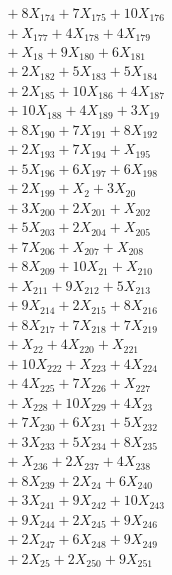 \documentclass[a4paper,10pt]{article}
\begin{document}
{\begin{align}
&\quad  + 8X_{174} + 7X_{175} + 10X_{176} \\[0.5ex]
&\quad  + X_{177} + 4X_{178} + 4X_{179} \\[0.5ex]
&\quad  + X_{18} + 9X_{180} + 6X_{181} \\[0.5ex]
&\quad  + 2X_{182} + 5X_{183} + 5X_{184} \\[0.5ex]
&\quad  + 2X_{185} + 10X_{186} + 4X_{187} \\[0.5ex]
&\quad  + 10X_{188} + 4X_{189} + 3X_{19} \\[0.5ex]
&\quad  + 8X_{190} + 7X_{191} + 8X_{192} \\[0.5ex]
&\quad  + 2X_{193} + 7X_{194} + X_{195} \\[0.5ex]
&\quad  + 5X_{196} + 6X_{197} + 6X_{198} \\[0.5ex]
&\quad  + 2X_{199} + X_{2} + 3X_{20} \\[0.5ex]
&\quad  + 3X_{200} + 2X_{201} + X_{202} \\[0.5ex]
&\quad  + 5X_{203} + 2X_{204} + X_{205} \\[0.5ex]
&\quad  + 7X_{206} + X_{207} + X_{208} \\[0.5ex]
&\quad  + 8X_{209} + 10X_{21} + X_{210} \\[0.5ex]
&\quad  + X_{211} + 9X_{212} + 5X_{213} \\[0.5ex]
&\quad  + 9X_{214} + 2X_{215} + 8X_{216} \\[0.5ex]
&\quad  + 8X_{217} + 7X_{218} + 7X_{219} \\[0.5ex]
&\quad  + X_{22} + 4X_{220} + X_{221} \\[0.5ex]
&\quad  + 10X_{222} + X_{223} + 4X_{224} \\[0.5ex]
&\quad  + 4X_{225} + 7X_{226} + X_{227} \\[0.5ex]
&\quad  + X_{228} + 10X_{229} + 4X_{23} \\[0.5ex]
&\quad  + 7X_{230} + 6X_{231} + 5X_{232} \\[0.5ex]
&\quad  + 3X_{233} + 5X_{234} + 8X_{235} \\[0.5ex]
&\quad  + X_{236} + 2X_{237} + 4X_{238} \\[0.5ex]
&\quad  + 8X_{239} + 2X_{24} + 6X_{240} \\[0.5ex]
&\quad  + 3X_{241} + 9X_{242} + 10X_{243} \\[0.5ex]
&\quad  + 9X_{244} + 2X_{245} + 9X_{246} \\[0.5ex]
&\quad  + 2X_{247} + 6X_{248} + 9X_{249} \\[0.5ex]
&\quad  + 2X_{25} + 2X_{250} + 9X_{251} \\[0.5ex]

\end{align}}
\end{document}
